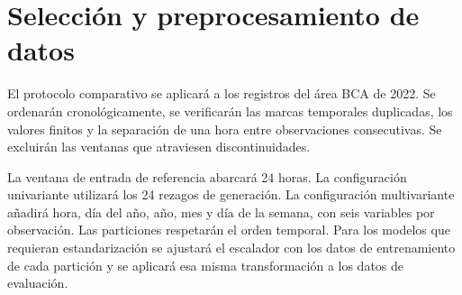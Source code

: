 \section{Selección y preprocesamiento de datos}

El protocolo comparativo se aplicará a los registros del área BCA de 2022. Se ordenarán cronológicamente, se verificarán las marcas temporales duplicadas, los valores finitos y la separación de una hora entre observaciones consecutivas. Se excluirán las ventanas que atraviesen discontinuidades.

La ventana de entrada de referencia abarcará 24 horas. La configuración univariante utilizará los 24 rezagos de generación. La configuración multivariante añadirá hora, día del año, año, mes y día de la semana, con seis variables por observación. Las particiones respetarán el orden temporal. Para los modelos que requieran estandarización se ajustará el escalador con los datos de entrenamiento de cada partición y se aplicará esa misma transformación a los datos de evaluación.
